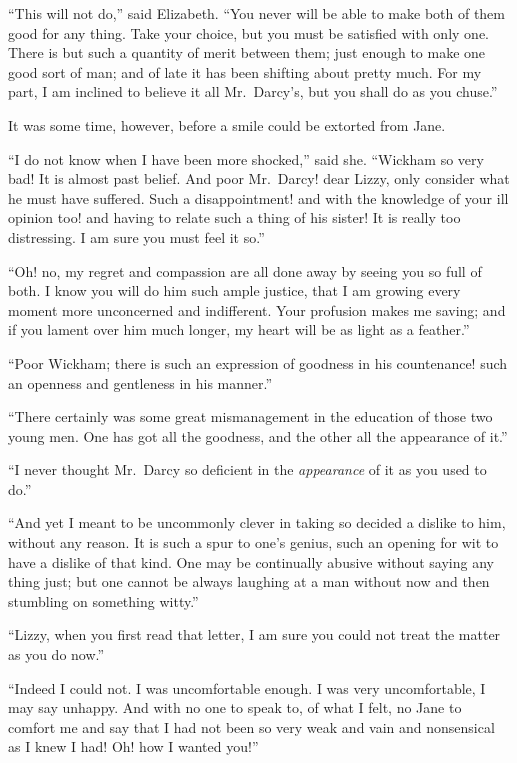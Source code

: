 “This will not do,” said Elizabeth. “You never will
be able to make both of them good for any thing. Take
your choice, but you must be satisfied with only one.
There is but such a quantity of merit between them;
just enough to make one good sort of man; and of late
it has been shifting about pretty much. For my part,
I am inclined to believe it all Mr.\ Darcy’s, but you shall
do as you chuse.”

It was some time, however, before a smile could be
extorted from Jane.

“I do not know when I have been more shocked,”
said she. “Wickham so very bad! It is almost past
belief. And poor Mr.\ Darcy! dear Lizzy, only consider
what he must have suffered. Such a disappointment!
and with the knowledge of your ill opinion too! and having
to relate such a thing of his sister! It is really too
distressing. I am sure you must feel it so.”

“Oh! no, my regret and compassion are all done away
by seeing you so full of both. I know you will do him
such ample justice, that I am growing every moment
more unconcerned and indifferent. Your profusion makes
me saving; and if you lament over him much longer,
my heart will be as light as a feather.”

“Poor Wickham; there is such an expression of goodness
in his countenance! such an openness and gentleness
in his manner.”

“There certainly was some great mismanagement in
the education of those two young men. One has got all
the goodness, and the other all the appearance of it.”

“I never thought Mr.\ Darcy so deficient in the \textit{appearance}
of it as you used to do.”

“And yet I meant to be uncommonly clever in taking
so decided a dislike to him, without any reason. It is
such a spur to one’s genius, such an opening for wit to
have a dislike of that kind. One may be continually
abusive without saying any thing just; but one cannot
be always laughing at a man without now and then
stumbling on something witty.”

“Lizzy, when you first read that letter, I am sure you
could not treat the matter as you do now.”

“Indeed I could not. I was uncomfortable en\-ough.
I was very uncomfortable, I may say unhappy. And with
no one to speak to, of what I felt, no Jane to comfort
me and say that I had not been so very weak and vain
and nonsensical as I knew I had! Oh! how I wanted you!”

